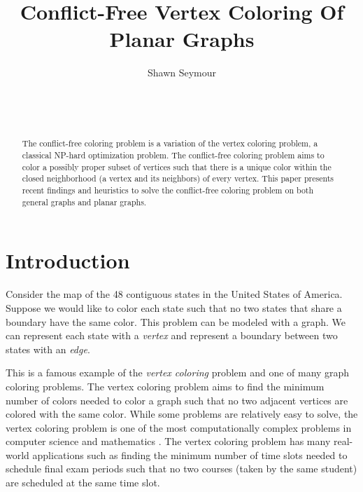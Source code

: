 \documentclass{sig-alternate}
\begin{document}

\title{Conflict-Free Vertex Coloring Of Planar Graphs}


\author{
\alignauthor
Shawn Seymour\\
	\\
	\\
	\\
}

\maketitle
\begin{abstract}
The conflict-free coloring problem is a variation of the vertex coloring problem, a classical NP-hard optimization problem. The conflict-free coloring problem aims to color a possibly proper subset of vertices such that there is a unique color within the closed neighborhood (a vertex and its neighbors) of every vertex. This paper presents recent findings and heuristics to solve the conflict-free coloring problem on both general graphs and planar graphs.
\end{abstract}

\section{Introduction}
\label{sec:introduction}

Consider the map of the 48 contiguous states in the United States of America. Suppose we would like to color each state such that no two states that share a boundary have the same color. This problem can be modeled with a graph. We can represent each state with a \emph{vertex} and represent a boundary between two states with an \emph{edge}.

This is a famous example of the \emph{vertex coloring} problem and one of many graph coloring problems. The vertex coloring problem aims to find the minimum number of colors needed to color a graph such that no two adjacent vertices are colored with the same color. While some problems are relatively easy to solve, the vertex coloring problem is one of the most computationally complex problems in computer science and mathematics \cite{bondy1976graph}. The vertex coloring problem has many real-world applications such as finding the minimum number of time slots needed to schedule final exam periods such that no two courses (taken by the same student) are scheduled at the same time slot.
\end{document}
